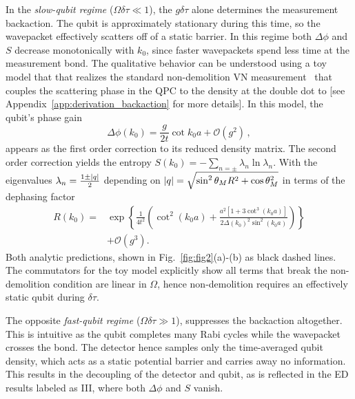\documentclass[10pt,
 amsmath,amssymb,
 aps,prb, twocolumn
]{revtex4-2}
\newcommand\sj[1]{ {\color{cyan} #1} }
\begin{document}
In the \textit{slow-qubit regime} ($\Omega\delta\tau\ll1$), the \mbox{$g \delta \tau$} alone determines the measurement backaction. The qubit is approximately stationary during this time, so the wavepacket effectively scatters off of a static barrier. In this regime both $\Delta\phi$ and $S$ decrease monotonically with $k_0$, since faster wavepackets spend less time at the measurement bond. The qualitative behavior can be understood using a toy model that that realizes the standard non-demolition VN measurement~\cite{braginskyNondemolition1996} that couples the scattering phase in the QPC \cite{buttikerTunnelingTime1982, aleinerOrthogonalityCatastrophe1997,sankarDetectorTuned2024} to the density at the double dot to  [see Appendix~\ref{app:derivation_backaction} for more details]. In this model, the qubit's phase gain
\begin{equation}\label{eq:phase_gain}
    \Delta \phi (k_0) = \frac{g}{2t} \cot{k_0 a} +\mathcal{O}\left(g^2\right) \,,
\end{equation}
appears as the first order correction to its reduced density matrix. The second order correction yields the entropy \mbox{$S(k_0) = -\sum_{n=\pm}\lambda_n \ln{\lambda_n}$}. With the eigenvalues \mbox{$\lambda_n = \frac{1\pm \abs{q}}{2}$} depending on $\abs{q} = \sqrt{\sin^2\theta_M R^2 + \cos\theta^2_M}$ in terms of the dephasing factor
\begin{align}\label{eq:entropy_gain}
    R(k_0) = & \exp\left\{\frac{1}{4 t^2} \left( \cot^2(k_0 a) + \frac{a^2 [1+3\cot^3 (k_0a)]}{2\Delta(k_0)^2 \sin^2(k_0a)} \right)\right\} \nonumber \\ & + \mathcal{O}(g^3).
\end{align}
 Both analytic predictions, shown in Fig.~\ref{fig:fig2}(a)-(b) as black dashed lines. \sj{The commutators for the toy model explicitly show all terms that break the non-demolition condition are linear in \mbox{$\Omega$}, hence non-demolition requires an effectively static qubit during \mbox{{$\delta\tau$}}.}

The opposite \textit{fast-qubit regime} ($\Omega\delta\tau\gg1$), suppresses the backaction altogether. This is intuitive as the qubit completes many Rabi cycles while the wavepacket crosses the bond. The detector hence samples only the time-averaged qubit density, which acts as a static potential barrier and carries away no information. This results in the decoupling of the detector and qubit, as is reflected in the ED results labeled as III, where both \mbox{$\Delta \phi$} and \mbox{$S$} vanish.
\end{document}
